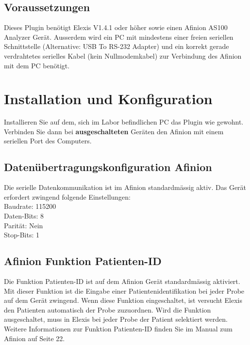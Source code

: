 \documentclass[a4paper]{scrartcl}
\begin{document}
\subsection{Voraussetzungen}
Dieses Plugin ben\"otigt Elexis V1.4.1 oder h\"oher sowie einen Afinion AS100 Analyzer Ger\"at. Ausserdem wird ein PC mit mindestens einer freien seriellen Schnittstelle (Alternative: USB To RS-232 Adapter) und ein korrekt gerade verdrahtetes serielles Kabel (kein Nullmodemkabel) zur Verbindung des Afinion mit dem PC ben\"otigt.

\section{Installation und Konfiguration}
Installieren Sie auf dem, sich im Labor befindlichen PC das Plugin wie gewohnt. Verbinden Sie dann bei \textbf{ausgeschalteten} Ger\"aten den Afinion mit einem seriellen Port des Computers. 
\subsection{Daten\"ubertragungskonfiguration Afinion}
Die serielle Datenkommunikation ist im Afinion standardm\"assig aktiv. Das Ger\"at erfordert zwingend folgende Einstellungen:\\
Baudrate: 115200\\
Daten-Bits: 8\\
Parit\"at: Nein\\
Stop-Bits: 1
\subsection{Afinion Funktion Patienten-ID}
Die Funktion Patienten-ID ist auf dem Afinion Ger\"at standardm\"assig aktiviert. Mit dieser Funktion ist die Eingabe einer Patientenidentifikation bei jeder Probe auf dem Ger\"at zwingend. Wenn diese Funktion eingeschaltet, ist versucht Elexis den Patienten automatisch der Probe zuzuordnen. Wird die Funktion ausgeschaltet, muss in Elexis bei jeder Probe der Patient selektiert werden.\\
Weitere Informationen zur Funktion Patienten-ID finden Sie im Manual zum Afinion auf Seite 22.
\pagebreak
\end{document}
